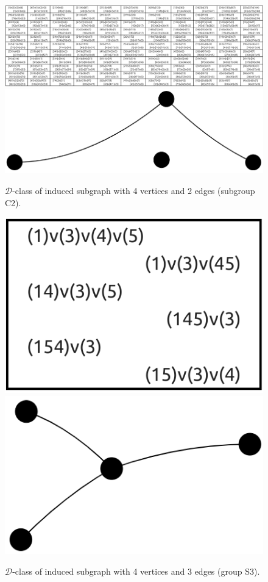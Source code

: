 \begin{appendices}
\begin{figure}[H]
\includegraphics[width=\textwidth,keepaspectratio]{images/x9/x9_4v_2e_2.png}
\includegraphics[scale=0.1]{images/x9/x9_4v_2e_2_vis.png}
\caption{$\mathcal{D}$-class of induced subgraph with 4 vertices and 2 edges (subgroup C2).}
\end{figure}

\begin{figure}[H]
\includegraphics[scale=0.1]{images/x9/x9_4v_3e_1.png}
\includegraphics[scale=0.1]{images/x9/x9_4v_3e_1_vis.png}
\caption{$\mathcal{D}$-class of induced subgraph with 4 vertices and 3 edges (group S3).}
\end{figure}


\end{appendices}
